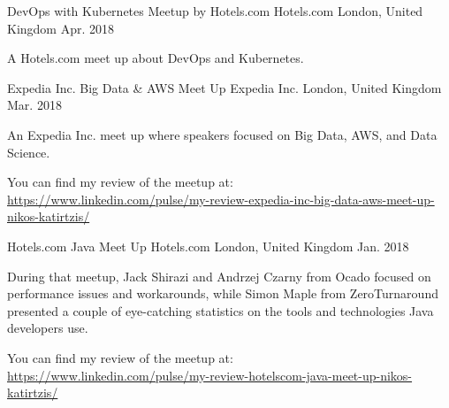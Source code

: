 

\begin{cventries}

  \cventry
    {DevOps with Kubernetes Meetup by Hotels.com} %
    {Hotels.com} %
    {London, United Kingdom} %
    {Apr. 2018} %
    {
      \begin{cvitems} %
        \item {A Hotels.com meet up about DevOps and Kubernetes.}
      \end{cvitems}
    }

  \cventry
    {Expedia Inc. Big Data \& AWS Meet Up} %
    {Expedia Inc.} %
    {London, United Kingdom} %
    {Mar. 2018} %
    {
      \begin{cvitems} %
        \item {An Expedia Inc. meet up where speakers focused on Big Data, AWS, and Data Science.}
        \item {You can find my review of the meetup at: \\ \url{https://www.linkedin.com/pulse/my-review-expedia-inc-big-data-aws-meet-up-nikos-katirtzis/}}
      \end{cvitems}
    }
    
  \cventry
    {Hotels.com Java Meet Up} %
    {Hotels.com} %
    {London, United Kingdom} %
    {Jan. 2018} %
    {
      \begin{cvitems} %
        \item {During that meetup, Jack Shirazi and Andrzej Czarny from Ocado focused on performance issues and workarounds, while Simon Maple from ZeroTurnaround presented a couple of eye-catching statistics on the tools and technologies Java developers use.}
        \item {You can find my review of the meetup at: \\ \url{https://www.linkedin.com/pulse/my-review-hotelscom-java-meet-up-nikos-katirtzis/}}
      \end{cvitems}
    }


\end{cventries}
